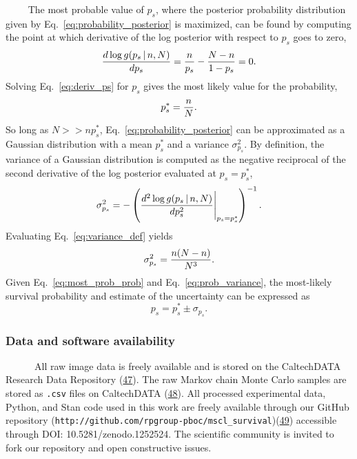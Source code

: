 ~~~~
The
most
probable
value
of
\(p_s\),
where
the
posterior
probability
distribution
given
by
Eq.~\ref{eq:probability_posterior}
is
maximized,
can be
found
by
computing
the
point
at
which
derivative
of the
log
posterior
with
respect
to
\(p_s\)
goes
to
zero,
\begin{equation}
{d\log g(p_s\,\vert\,n, N) \over d p_s} = {n \over p_s} - {N - n  \over 1 - p_s} = 0.
\label{eq:deriv_ps}\end{equation}
Solving
Eq.~\ref{eq:deriv_ps}
for
\(p_s\)
gives
the
most
likely
value
for
the
probability,
\begin{equation}
p_s^* = {n \over N}.
\label{eq:most_prob_prob}\end{equation}
So
long
as
\(N >> np_s^*\),
Eq.~\ref{eq:probability_posterior}
can be
approximated
as a
Gaussian
distribution
with a
mean
\(p_s^*\)
and a
variance
\(\sigma_{p_s}^2\).
By
definition,
the
variance
of a
Gaussian
distribution
is
computed
as the
negative
reciprocal
of the
second
derivative
of the
log
posterior
evaluated
at
\(p_s = p_s^*\),
\begin{equation}
\sigma_{p_s}^2 = - \left({d^2 \log g(p_s\,\vert\, n, N) \over dp_s^2}\Bigg\vert_{p_s=p_s^*}\right)^{-1}.
\label{eq:variance_def}\end{equation}
Evaluating
Eq.~\ref{eq:variance_def}
yields
\begin{equation}
\sigma_{p_s}^2 = {n(N-n)\over N^3}.
\label{eq:prob_variance}\end{equation}
Given
Eq.~\ref{eq:most_prob_prob}
and
Eq.~\ref{eq:prob_variance},
the
most-likely
survival
probability
and
estimate
of the
uncertainty
can be
expressed
as
\begin{equation}
p_s = p_s^* \pm \sigma_{p_s}.
\end{equation}

\subsubsection{Data
and
software
availability}\label{data-and-software-availability}

~ ~ ~
~All
raw
image
data
is
freely
available
and is
stored
on the
CaltechDATA
Research
Data
Repository
(\protect\hyperlink{ref-chure2018a}{47}).
The
raw
Markov
chain
Monte
Carlo
samples
are
stored
as
\texttt{.csv}
files
on
CaltechDATA
(\protect\hyperlink{ref-chure2018}{48}).
All
processed
experimental
data,
Python,
and
Stan
code
used
in
this
work
are
freely
available
through
our
GitHub
repository
(\texttt{http://github.com/rpgroup-pboc/mscl\_survival})(\protect\hyperlink{ref-chure2018b}{49})
accessible
through
DOI:
10.5281/zenodo.1252524.
The
scientific
community
is
invited
to
fork
our
repository
and
open
constructive
issues.

